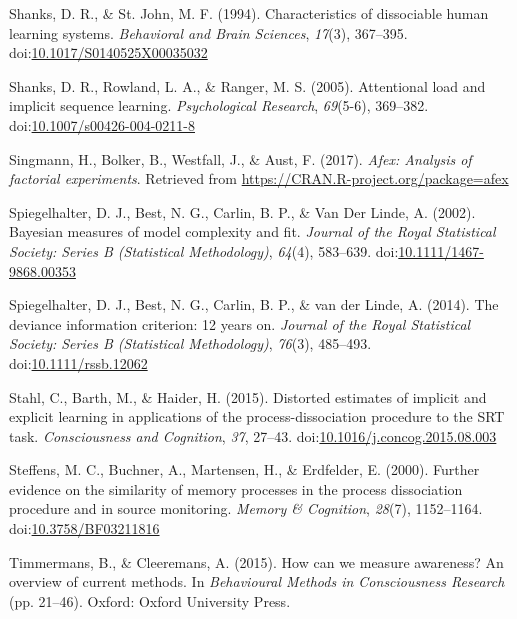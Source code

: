 \documentclass[jou]{apa6}
\theoremstyle{definition}
\theoremstyle{definition}
\theoremstyle{definition}
\theoremstyle{remark}
\begin{document}
\hypertarget{ref-shanks_characteristics_1994}{}
Shanks, D. R., \& St. John, M. F. (1994). Characteristics of dissociable
human learning systems. \emph{Behavioral and Brain Sciences},
\emph{17}(3), 367--395.
doi:\href{https://doi.org/10.1017/S0140525X00035032}{10.1017/S0140525X00035032}

\hypertarget{ref-shanks_attentional_2005}{}
Shanks, D. R., Rowland, L. A., \& Ranger, M. S. (2005). Attentional load
and implicit sequence learning. \emph{Psychological Research},
\emph{69}(5-6), 369--382.
doi:\href{https://doi.org/10.1007/s00426-004-0211-8}{10.1007/s00426-004-0211-8}

\hypertarget{ref-R-afex}{}
Singmann, H., Bolker, B., Westfall, J., \& Aust, F. (2017). \emph{Afex:
Analysis of factorial experiments}. Retrieved from
\url{https://CRAN.R-project.org/package=afex}

\hypertarget{ref-spiegelhalter_bayesian_2002}{}
Spiegelhalter, D. J., Best, N. G., Carlin, B. P., \& Van Der Linde, A.
(2002). Bayesian measures of model complexity and fit. \emph{Journal of
the Royal Statistical Society: Series B (Statistical Methodology)},
\emph{64}(4), 583--639.
doi:\href{https://doi.org/10.1111/1467-9868.00353}{10.1111/1467-9868.00353}

\hypertarget{ref-spiegelhalter_deviance_2014}{}
Spiegelhalter, D. J., Best, N. G., Carlin, B. P., \& van der Linde, A.
(2014). The deviance information criterion: 12 years on. \emph{Journal
of the Royal Statistical Society: Series B (Statistical Methodology)},
\emph{76}(3), 485--493.
doi:\href{https://doi.org/10.1111/rssb.12062}{10.1111/rssb.12062}

\hypertarget{ref-stahl_distorted_2015}{}
Stahl, C., Barth, M., \& Haider, H. (2015). Distorted estimates of
implicit and explicit learning in applications of the
process-dissociation procedure to the SRT task. \emph{Consciousness and
Cognition}, \emph{37}, 27--43.
doi:\href{https://doi.org/10.1016/j.concog.2015.08.003}{10.1016/j.concog.2015.08.003}

\hypertarget{ref-steffens_further_2000}{}
Steffens, M. C., Buchner, A., Martensen, H., \& Erdfelder, E. (2000).
Further evidence on the similarity of memory processes in the process
dissociation procedure and in source monitoring. \emph{Memory \&
Cognition}, \emph{28}(7), 1152--1164.
doi:\href{https://doi.org/10.3758/BF03211816}{10.3758/BF03211816}

\hypertarget{ref-timmermans_how_2015}{}
Timmermans, B., \& Cleeremans, A. (2015). How can we measure awareness?
An overview of current methods. In \emph{Behavioural Methods in
Consciousness Research} (pp. 21--46). Oxford: Oxford University Press.
\end{document}
